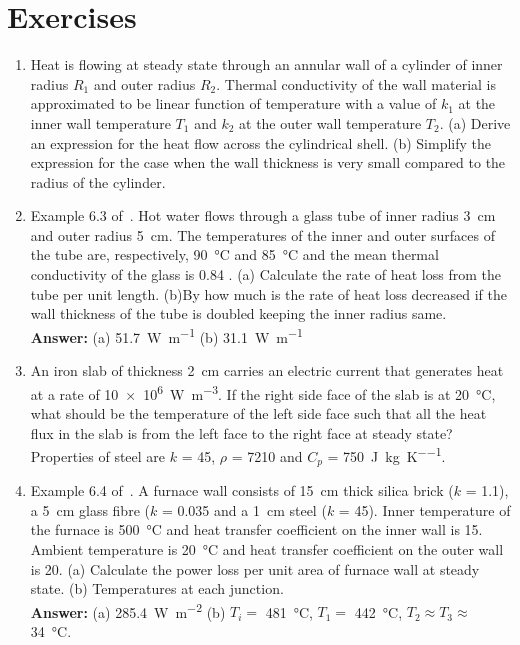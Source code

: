 \section{Exercises}

\begin{enumerate}

 \item Heat is flowing at steady state through an annular wall of a cylinder of
inner radius $R_1$ and outer radius $R_2$. Thermal conductivity of the wall
material is approximated to be linear function of temperature with a value of
$k_1$ at the inner wall temperature $T_1$ and $k_2$ at the outer wall
temperature $T_2$. (a) Derive an expression for the heat flow across the
cylindrical shell. (b) Simplify the expression for the case when the wall
thickness is very small compared to the radius of the cylinder.


 \item Example 6.3 of~\cite{gaskell}. Hot water flows through a glass tube of
inner radius \SI{3}{\cm} and outer radius \SI{5}{\cm}. The temperatures of the
inner and outer surfaces of the tube are, respectively, \SI{90}{\celsius} and
\SI{85}{\celsius} and the mean thermal conductivity of the glass is
\SI{0.84}{\wpmk} . (a) Calculate the rate of heat loss from the tube per unit
length. (b)By how much is the rate of heat loss decreased if the wall thickness
of the tube is doubled keeping the inner radius same.\\ {\bf Answer:} (a)
\SI{51.7}{\watt\per\metre} (b) \SI{31.1}{\watt\per\metre}

 \item An iron slab of thickness \SI{2}{\cm} carries an electric current that
generates heat at a rate of \SI{10e6}{\watt\per\metre\cubed}. If the right side
face of the slab is at \SI{20}{\celsius}, what should be the temperature of the
left side face such that all the heat flux in the slab is from the left face to
the right face at steady state? Properties of steel are $k$ = \SI{45}{\wpmk},
$\rho$ = \SI{7210}{\kgpmc} and $C_p$ =
\SI{750}{\joule\per\kilo\gram\per\kelvin}.

\item Example 6.4 of~\cite{gaskell}. A furnace wall consists of \SI{15}{
		\centi\metre} thick silica brick ($k$ = \SI{1.1}{\wpmk}), a \SI{5}{\cm} glass
fibre ($k$ = \SI{0.035}{\wpmk} and a \SI{1}{\cm} steel ($k$ = \SI{45}{\wpmk}).
Inner temperature of the furnace is \SI{500}{\celsius} and heat transfer
coefficient on the inner wall is \SI{15}{\wpmsk}. Ambient temperature is
\SI{20}{\celsius} and heat transfer coefficient on the outer wall is
\SI{20}{\wpmsk}. (a) Calculate the power loss per unit area of furnace wall at
steady state. (b) Temperatures at each junction. \\ {\bf Answer:} (a)
		\SI{285.4}{\watt\per\metre\squared} (b) $T_i = $ \SI{481}{\celsius}, $T_1 = $ \SI{442}{
			\celsius}, $T_2 \approx T_3 \approx$ \SI{34}{\celsius}.


\end{enumerate}
